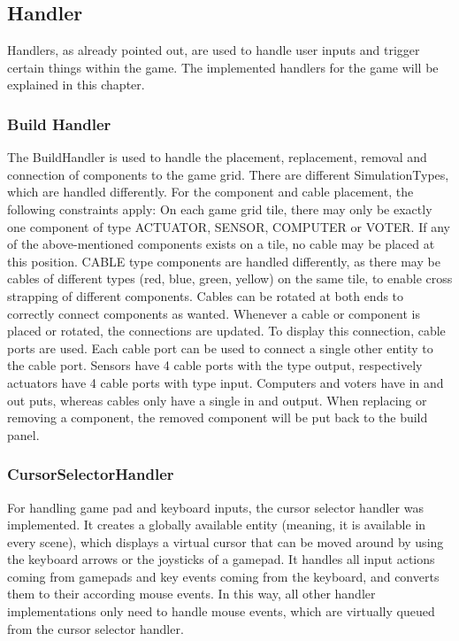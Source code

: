 \subsection{Handler}\label{subsec:handler}
Handlers, as already pointed out, are used to handle user inputs and trigger certain things within the game.
The implemented handlers for the game will be explained in this chapter.
\subsubsection{Build Handler}\label{subsubsec:build-handler}
The BuildHandler is used to handle the placement, replacement, removal and connection of components to the game grid.
There are different SimulationTypes, which are handled differently.
For the component and cable placement, the following constraints apply:
On each game grid tile, there may only be exactly one component of type ACTUATOR, SENSOR, COMPUTER or VOTER.
If any of the above-mentioned components exists on a tile, no cable may be placed at this position.
CABLE type components are handled differently, as there may be cables of different types (red, blue, green, yellow) on the same tile, to enable
cross strapping of different components.
Cables can be rotated at both ends to correctly connect components as wanted.
Whenever a cable or component is placed or rotated, the connections are updated.
To display this connection, cable ports are used.
Each cable port can be used to connect a single other entity to the cable port.
Sensors have 4 cable ports with the type output, respectively actuators have 4 cable ports with type input.
Computers and voters have in and out puts, whereas cables only have a single in and output.
When replacing or removing a component, the removed component will be put back to the build panel.

\subsubsection{CursorSelectorHandler}\label{subsubsec:cursorselectorhandler}
For handling game pad and keyboard inputs, the cursor selector handler was implemented.
It creates a globally available entity (meaning, it is available in every scene), which displays a virtual cursor that can be
moved around by using the keyboard arrows or the joysticks of a gamepad.
It handles all input actions coming from gamepads and key events coming from the keyboard, and converts them to their according mouse events.
In this way, all other handler implementations only need to handle mouse events, which are virtually queued from the cursor selector handler.

